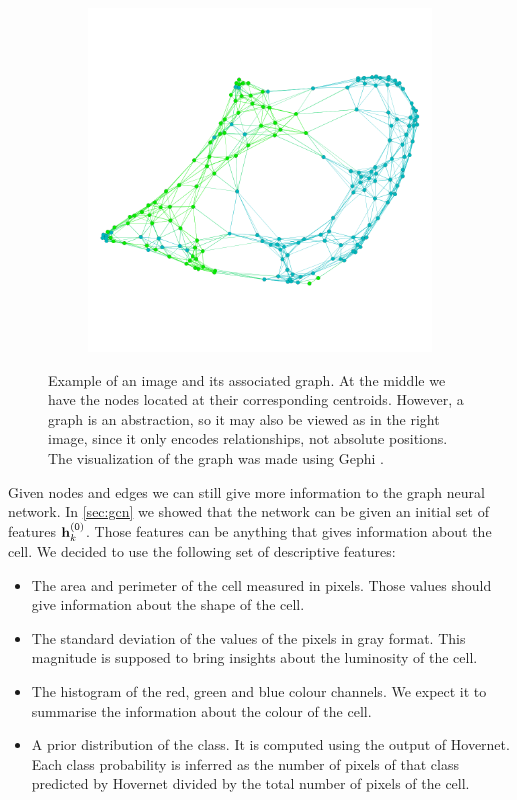 \begin{figure}[h]
\begin{subfigure}{0.3\textwidth}
    \end{subfigure}
    \begin{subfigure}{0.3\textwidth}
      \centering
      \includegraphics[width=\textwidth]{imgs/graph_class.png}
    \end{subfigure}
    \caption{Example of an image and its associated graph. At the middle we have the nodes located at their corresponding centroids. However, a graph is an abstraction, so it may also be viewed as in the right image, since it only encodes relationships, not absolute positions. The visualization of the graph was made using Gephi \cite{gephi}.}
    \label{fig:graph_def}
\end{figure}

Given nodes and edges we can still give more information to the graph neural network. In \autoref{sec:gcn} we showed that the network can be given an initial set of features ${\mathbf h}_k^{(0)}$. Those features can be anything that gives information about the cell. We decided to use the following set of descriptive features:

\begin{itemize}
    \item The area and perimeter of the cell measured in pixels. Those values should give information about the shape of the cell.
    \item The standard deviation of the values of the pixels in gray format. This magnitude is supposed to bring insights about the luminosity of the cell.
    \item The histogram of the red, green and blue colour channels. We expect it to summarise the information about the colour of the cell.
    \item A prior distribution of the class. It is computed using the output of Hovernet. Each class probability is inferred as the number of pixels of that class predicted by Hovernet divided by the total number of pixels of the cell.
\end{itemize}

